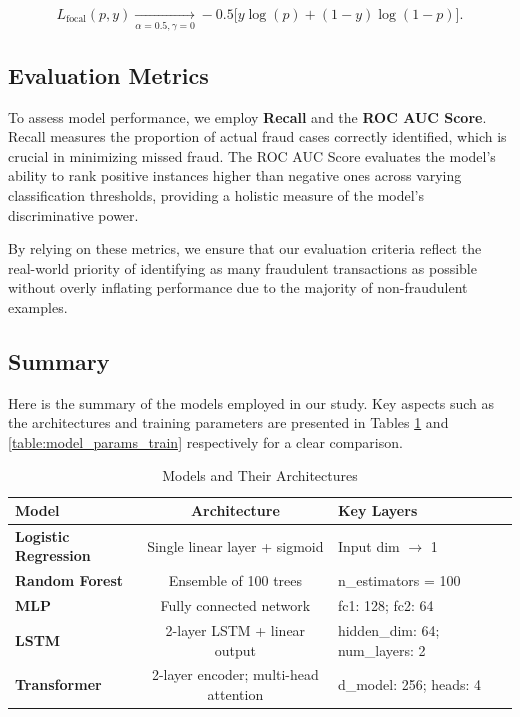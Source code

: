 \documentclass[11pt, oneside]{article}   	%
\begin{document}
\[
L_{\text{focal}}(p,y) \xrightarrow[\alpha=0.5,\gamma=0]{} -0.5 \bigl[y \log(p) + (1 - y)\log(1 - p)\bigr].
\]

\subsection{Evaluation Metrics}

To assess model performance, we employ \textbf{Recall} and the \textbf{ROC AUC Score}. Recall measures the proportion of actual fraud cases correctly identified, which is crucial in minimizing missed fraud. The ROC AUC Score evaluates the model’s ability to rank positive instances higher than negative ones across varying classification thresholds, providing a holistic measure of the model's discriminative power.

By relying on these metrics, we ensure that our evaluation criteria reflect the real-world priority of identifying as many fraudulent transactions as possible without overly inflating performance due to the majority of non-fraudulent examples.

\subsection{Summary}
Here is the summary of the models employed in our study. Key aspects such as the architectures and training parameters are presented in Tables \ref{table:model_params_arch} and \ref{table:model_params_train} respectively for a clear comparison.

\begin{table}[H]
\centering
\caption{Models and Their Architectures}
\label{table:model_params_arch}
\begin{tabular}{lcp{3.85cm}c}
\hline
\textbf{Model} & \textbf{Architecture} & \textbf{Key Layers} \\ \hline
\textbf{Logistic Regression} & Single linear layer + sigmoid & Input dim $\rightarrow$ 1 \\[4pt]
\textbf{Random Forest} & Ensemble of 100 trees & n\_estimators = 100 \\[4pt]
\textbf{MLP} & Fully connected network & fc1: 128; fc2: 64 \\[4pt]
\textbf{LSTM} & 2-layer LSTM + linear output & hidden\_dim: 64; \newline num\_layers: 2 \\[4pt]
\textbf{Transformer} & 2-layer encoder; multi-head attention & d\_model: 256; heads: 4 \\ \hline
\end{tabular}
\end{table}
\end{document}
